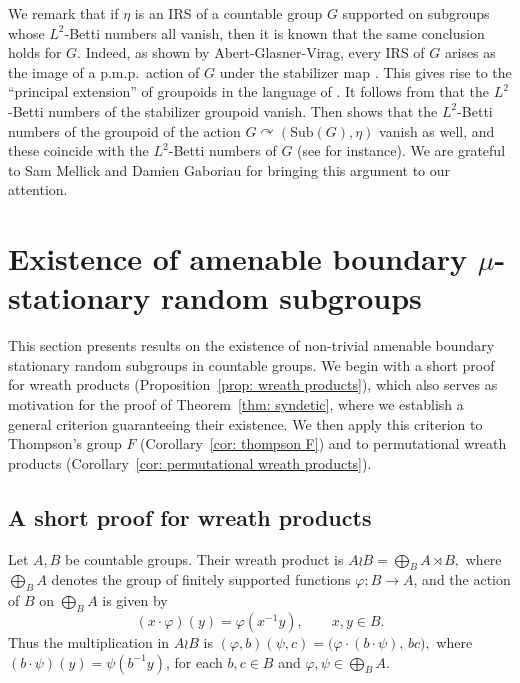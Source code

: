 \documentclass[reqno,a4paper,11pt]{amsart}
\numberwithin{equation}{section}
\newcommand{\1}{\mathbf{1}}
\newcommand{\sub}[1]{\mathrm{Sub}(#1)}
\theoremstyle{definition}
\begin{document}
We remark that if $\eta$ is an IRS of a countable group $G$ supported on subgroups whose $L^2$-Betti numbers all vanish, then it is known that the same conclusion holds for $G$. Indeed, as shown by Abert-Glasner-Virag, every IRS of $G$ arises as the image of a p.m.p.\ action of $G$ under the stabilizer map \cite[Proposition 13]{AbertGlasnerVirag}. This gives rise to the ``principal extension'' of groupoids in the language of \cite[Section 5.3]{SauerThom2010}. It follows from \cite[Lemma 5.1]{SauerThom2010} that the $L^2$-Betti numbers of the stabilizer groupoid vanish. Then \cite[Theorem 1.3]{SauerThom2010} shows that the $L^2$-Betti numbers of the groupoid of the action $G \curvearrowright (\sub{G}, \eta)$ vanish as well, and these coincide with the $L^2$-Betti numbers of $G$  (see \cite[Theorem 5.4]{CarderiGaboriauDeLaSalle2021} for instance). We are grateful to Sam Mellick and Damien Gaboriau for bringing this argument to our attention.


	\section{Existence of amenable boundary $\mu$-stationary random subgroups} \label{sec:lampBoundaries}
	
	This section presents results on the existence of non-trivial amenable boundary stationary random subgroups in countable groups. We begin with a short proof for wreath products (Proposition~\ref{prop: wreath products}), which also serves as motivation for the proof of Theorem~\ref{thm: syndetic}, where we establish a general criterion guaranteeing their existence. We then apply this criterion to Thompson's group $F$ (Corollary~\ref{cor: thompson F}) and to permutational wreath products (Corollary~\ref{cor: permutational wreath products}).
	
	
	
	
	\subsection{A short proof for wreath products}\label{subsection: wreath}
	Let $A, B$ be countable groups. Their wreath product is \(A \wr B = \bigoplus_B A \rtimes B,\)
	where $\bigoplus_B A$ denotes the group of finitely supported functions
	$\varphi : B \to A$, and the action of $B$ on $\bigoplus_B A$ is given by
	\[
	(x\cdot \varphi)(y) = \varphi(x^{-1}y), \qquad x,y\in B .
	\]
	Thus the multiplication in $A \wr B$ is
	\(
	(\varphi,b)(\psi,c)
	=
	\bigl(\varphi \cdot (b\cdot \psi),\, bc\bigr),
	\) where $(b\cdot\psi)(y)=\psi(b^{-1}y)$, for each $b,c\in B$ and $\varphi,\psi\in \bigoplus_B A$.
	
\end{document}
